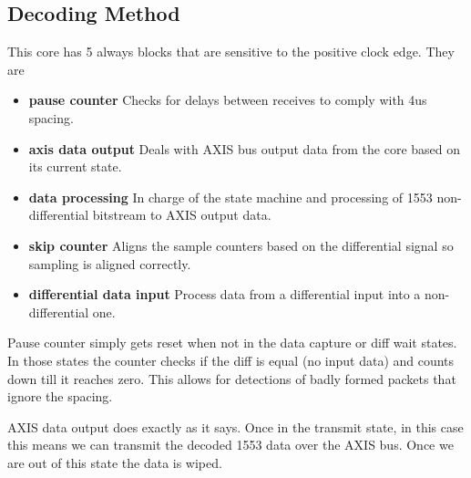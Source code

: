 \subsection{Decoding Method}
\par
This core has 5 always blocks that are sensitive to the positive clock edge. They are

\begin{itemize}
\item \textbf{pause counter} Checks for delays between receives to comply with 4us spacing.
\item \textbf{axis data output} Deals with AXIS bus output data from the core based on its current state.
\item \textbf{data processing} In charge of the state machine and processing of 1553 non-differential bitstream to AXIS output data.
\item \textbf{skip counter} Aligns the sample counters based on the differential signal so sampling is aligned correctly.
\item \textbf{differential data input} Process data from a differential input into a non-differential one.
\end{itemize}

\par
Pause counter simply gets reset when not in the data capture or diff wait states. In those states the counter checks if the diff is equal (no input data) and counts down
till it reaches zero. This allows for detections of badly formed packets that ignore the spacing.

\par
AXIS data output does exactly as it says. Once in the transmit state, in this case this means we can transmit the decoded 1553 data over the AXIS bus. Once we are out of this state
the data is wiped.

